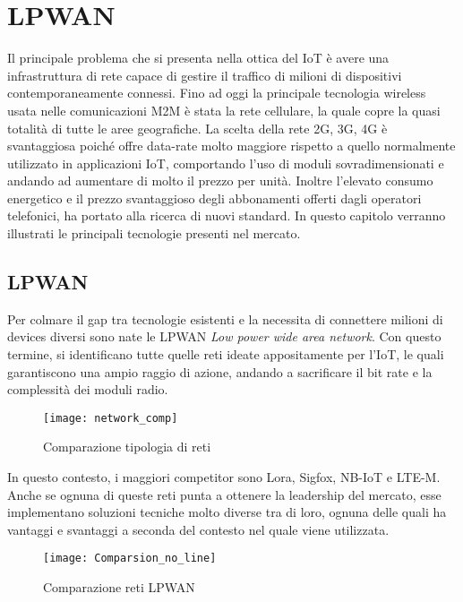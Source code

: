 \chapter{LPWAN}
Il principale problema che si presenta nella ottica del IoT è avere una
infrastruttura di rete capace di gestire il traffico di milioni di dispositivi
contemporaneamente connessi. Fino ad oggi la principale tecnologia wireless 
usata nelle comunicazioni M2M è stata la rete cellulare, la quale copre la quasi
totalità di tutte le aree geografiche.
La scelta della rete 2G, 3G, 4G è svantaggiosa poiché offre data-rate molto
maggiore rispetto a quello normalmente utilizzato in applicazioni IoT,
comportando l'uso di moduli sovradimensionati e andando ad aumentare di molto il
prezzo per unità. Inoltre l'elevato consumo energetico e il prezzo svantaggioso
degli abbonamenti offerti dagli operatori telefonici, ha portato alla ricerca di
nuovi standard. 
In questo capitolo verranno illustrati le principali tecnologie presenti nel
mercato.

\section{LPWAN}
Per colmare il gap tra tecnologie esistenti e la necessita di connettere milioni
di devices diversi sono nate le  LPWAN \emph{Low power wide area network}.
Con questo termine, si identificano tutte quelle reti ideate appositamente per
l'IoT, le quali garantiscono una ampio raggio di azione, andando a sacrificare
il bit rate e la complessità dei moduli radio.

\begin{figure}[h]
    \centering 
        \texttt{[image: network\_comp]}
    \caption{Comparazione tipologia di reti}
\end{figure}

In questo contesto, i maggiori competitor sono Lora, Sigfox, NB-IoT e LTE-M.
Anche se ognuna di queste reti punta a ottenere la leadership del mercato,
esse implementano soluzioni tecniche molto diverse tra di loro, ognuna delle
quali ha vantaggi e svantaggi a seconda del contesto nel quale viene utilizzata.

\begin{figure}[h]
    \centering 
        \texttt{[image: Comparsion\_no\_line]}
    \caption{Comparazione reti LPWAN}
    \label{fig:comparazione_reti}
\end{figure}

